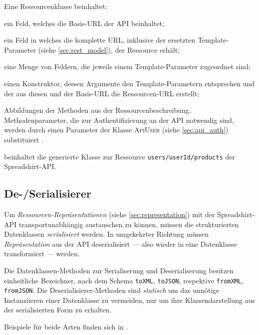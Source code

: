 Eine Ressourcenklasse beinhaltet:
\begin{compactitem}
    \item[\ding{202}] ein Feld, welches die Basis-\gls{URL} der API beinhaltet;
    \item[\ding{203}] ein Feld in welches die komplette \gls{URL}, inklusive der ersetzten Template-Parameter (siehe \cref{sec:rest_model}), der Ressource erhält;
    \item[\ding{204}] eine Menge von Feldern, die jeweils einem Template-Parameter zugeordnet sind;
    \item[\ding{205}] einen Konstruktor, dessen Argumente den Template-Parametern entsprechen und der aus diesen und der Basis-\gls{URL} die Ressourcen-\gls{URL} erstellt;
    \item[\ding{206}] Abbildungen der Methoden aus der Ressourcenbeschreibung. Methodenparameter, die zur Authentifizierung an der \gls{API} notwendig sind, werden durch einen Parameter der Klasse \textsc{ApiUser} (siehe \cref{sec:api_auth}) substituiert .
\end{compactitem}

 beinhaltet die generierte Klasse zur Ressource \texttt{users/{userId}/products} der Spreadshirt-\gls{API}.

\subsection{De-/Serialisierer}
\label{sec:serialiser}

Um \emph{Ressourcen-Repräsentationen} (siehe \cref{sec:representation}) mit der Spreadshirt-\gls{API} transportunabhängig austauschen zu können, müssen die strukturierten Datenklassen \emph{serialisiert} werden. In umgekehrter Richtung müssen \emph{Repräsentation} aus der \gls{API} deserialisiert --- also wieder in eine Datenklasse transformiert --- werden.

Die Datenklassen-Methoden zur Serialiserung und Deserialiserung besitzen einheitliche Bezeichner, nach dem Schema \texttt{toXML}, \texttt{toJSON}, respektive \texttt{fromXML}, \texttt{fromJSON}. Die Deserialisierer-Methoden sind \emph{statisch} um das unnötige Instanziieren einer Datenklasse zu vermeiden, nur um ihre Klassendarstellung aus der serialisierten Form zu erhalten.

Beispiele für beide Arten finden sich in .

